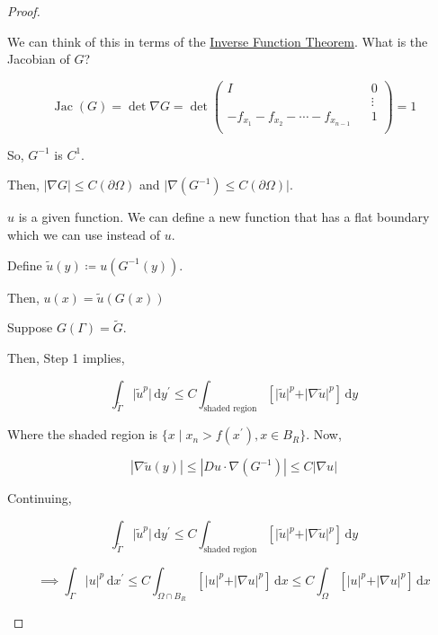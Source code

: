 \documentclass{article}
\theoremstyle{definition}
\begin{document}
\begin{proof}
\begin{enumerate}[label=\arabic*)]
        We can think of this in terms of the \underline{Inverse Function Theorem}. What is the Jacobian of \(G\)?

        \[
            \operatorname{Jac}(G) = \det \nabla G = \det \begin{pmatrix}
                I &  &  0 \\
                 &  &  \vdots \\
                -f_{x_1} - f_{x_2} - \cdots - f_{x_{n-1}} &  &  1 \\
            \end{pmatrix} = 1
        \]

        So, \(G ^{-1}\) is \(C^1\).

        Then, \(\vert \nabla G \vert \leq C (\partial \Omega)\) and \(\vert \nabla(G ^{-1} ) \leq C(\partial \Omega) \vert \).

        \(u\) is a given function. We can define a new function that has a flat boundary which we can use instead of \(u\).

        Define \(\tilde{u}(y) \coloneqq u(G ^{-1} (y))\).

        Then, \(u(x) = \tilde{u}(G(x))\) 

        Suppose \(G(\Gamma) = \tilde{G}\).

        Then, Step 1 implies,

        \[
            \int_{\tilde{\Gamma}}^{} \vert \tilde{u}^p \vert  \,\mathrm{d}y^{\prime}  \leq C \int_{\text{shaded region}}^{} \left[ \vert \tilde{u} \vert ^ p + \vert \nabla \tilde{u} \vert ^ p \right]  \,\mathrm{d}y
        \]

        Where the shaded region is \(\{ x \mid x_n > f(x^{\prime}), x\in B_R \} \). Now,

        \[
            \left\vert \nabla \tilde{u}(y) \right\vert \leq \left\vert D u \cdot \nabla(G ^{-1}) \right\vert \leq C \left\vert \nabla u \right\vert 
        \]

        Continuing,

        \[
            \int_{\tilde{\Gamma}}^{} \vert \tilde{u}^p \vert  \,\mathrm{d}y^{\prime}  \leq C \int_{\text{shaded region}}^{} \left[ \vert \tilde{u} \vert ^ p + \vert \nabla \tilde{u} \vert ^ p \right]  \,\mathrm{d}y
        \]

        \[
            \implies \int_{\Gamma }^{} \vert u \vert ^ p \,\mathrm{d}x^{\prime} \leq C \int_{\Omega \cap B_R}^{} \left[ \vert u \vert ^ p + \vert \nabla u \vert ^ p \right]  \,\mathrm{d}x \leq C \int_{\Omega}^{} \left[ \vert u \vert ^ p + \vert \nabla u \vert ^ p \right]  \,\mathrm{d}x  
        \]


\end{enumerate}
\end{proof}
\end{document}

